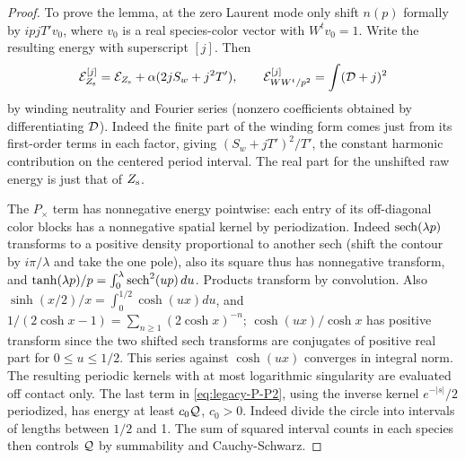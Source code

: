 \begin{proof}
To prove the lemma, at the zero Laurent mode only shift \(n(p)\)
formally by \(ipjT'v_0\), where \(v_0\) is a real species-color
vector with \(W^tv_0=1\). Write the resulting energy with
superscript \([j]\). Then
\[
 {\cal E}_{Z_{\rm s}}^{[j]}={\cal E}_{Z_{\rm s}}+\alpha(2j S_w+j^2T'),\qquad
 {\cal E}_{WW^t/p^2}^{[j]}=\int({\cal D}+j)^2
\]
by winding neutrality and Fourier series (nonzero coefficients obtained by differentiating \({\cal D}\)). Indeed the finite part of the winding form comes just from its first-order terms in each factor, giving \((S_w+jT')^2/T'\), the constant harmonic contribution on the centered period interval. The real part for the unshifted raw energy is just that of \(Z_{\rm s}\).

The \(P_{\times}\) term has nonnegative energy pointwise: each entry of its off-diagonal color blocks has a nonnegative spatial kernel by periodization. Indeed \({\rm sech}(\lambda p)\) transforms to a positive density proportional to another sech (shift the contour by \(i\pi/\lambda\) and take the one pole), also its square thus has nonnegative transform, and \(\tanh(\lambda p)/p=\int_0^\lambda{\rm sech}^2(up)\,du\). Products transform by convolution. Also \(\sinh(x/2)/x=\int_0^{1/2}\cosh(u x)du\), and \(1/(2\cosh x-1)=\sum_{n\ge1}(2\cosh x)^{-n}\); \(\cosh(ux)/\cosh x\) has positive transform since the two shifted sech transforms are conjugates of positive real part for \(0\le u\le1/2\). This series against \(\cosh(ux)\) converges in integral norm. The resulting periodic kernels with at most logarithmic singularity are evaluated off contact only. The last term in \eqref{eq:legacy-P-P2}, using the inverse kernel \(e^{-|s|}/2\) periodized, has energy at least \(c_0{\cal Q}\), \(c_0>0\). Indeed divide the circle into intervals of lengths between \(1/2\) and 1. The sum of squared interval counts in each species then controls \({\cal Q}\) by summability and Cauchy-Schwarz.


\end{proof}
